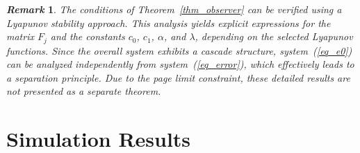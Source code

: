 \documentclass{ifacconf}
\def\eqref#1{(\ref{#1})}
\newtheorem{remark}{\it \textbf{Remark}}%
\begin{document}

\begin{remark}
The conditions of Theorem~\ref{thm_observer} can be verified using a Lyapunov stability approach. This analysis yields explicit expressions for the matrix $F_{j}$ and the constants $c_0$, $c_1$, $\alpha$, and $\lambda$, depending on the selected Lyapunov functions. Since the overall system exhibits a cascade structure, system~\eqref{eq_e0} can be analyzed independently from system~\eqref{eq_error}, which effectively leads to a separation principle. Due to the page limit constraint, these detailed results are not presented as a separate theorem.
\end{remark}
\vspace*{-0.3cm}

\section{Simulation Results}\label{sec_simulation}
\vspace*{-0.3cm}
\end{document}

